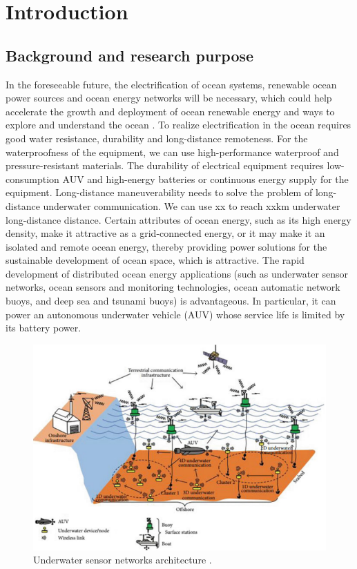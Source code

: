\chapter{Introduction}
\section{Background and research purpose}
In the foreseeable future, the electrification of ocean systems, renewable ocean power sources and ocean energy networks will be necessary, which could help accelerate the growth and deployment of ocean renewable energy and ways to explore and understand the ocean \cite{Orekan}. To realize electrification in the ocean requires good water resistance, durability and long-distance remoteness. For the waterproofness of the equipment, we can use high-performance waterproof and pressure-resistant materials. The durability of electrical equipment requires low-consumption AUV and high-energy batteries or continuous energy supply for the equipment. Long-distance maneuverability needs to solve the problem of long-distance underwater communication. We can use xx to reach xxkm underwater long-distance distance.
Certain attributes of ocean energy, such as its high energy density, make it attractive as a grid-connected energy, or it may make it an isolated and remote ocean energy, thereby providing power solutions for the sustainable development of ocean space, which is attractive. The rapid development of distributed ocean energy applications (such as underwater sensor networks, ocean sensors and monitoring technologies, ocean automatic network buoys, and deep sea and tsunami buoys) is advantageous. In particular, it can power an autonomous underwater vehicle (AUV) whose service life is limited by its battery power.

\begin{figure}[htbp]
    \centering
    \includegraphics[width=0.9\linewidth]{images/1_underwater_sensor_networks.png}
    \caption{Underwater sensor networks architecture \cite{Nayyar}.}
\end{figure}

